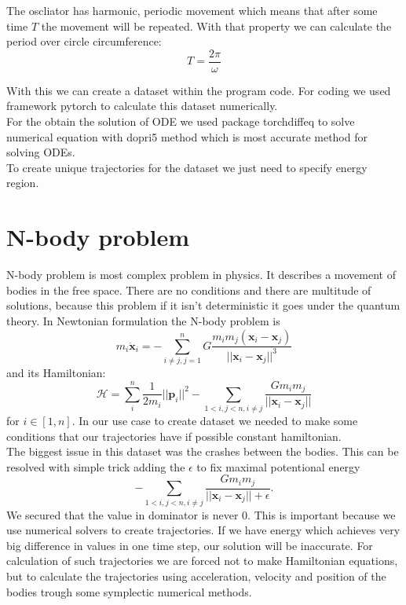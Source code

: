 The oscliator has harmonic, periodic movement which means that after some time $T$ the movement will be repeated. With that property we can calculate the period over circle circumference:
\begin{equation}
	T = \frac{2\pi}{\omega}
\end{equation}

With this we can create a dataset within the program code. For coding we used framework pytorch to calculate this dataset numerically.\\
For the obtain the solution of ODE we used package torchdiffeq to solve numerical equation with dopri5 method which is most accurate method for solving ODEs.\\
To create unique trajectories for the dataset we just need to specify energy region.


\section{N-body problem}
N-body problem is most complex problem in physics. It describes a movement of bodies in the free space. There are no conditions and there are multitude of solutions, because this problem if it isn't deterministic it goes under the quantum theory. 
In Newtonian formulation the N-body problem is
\begin{equation}
m_i\ddot{\mathbf{x}}_i = -\sum_{i\neq j, j=1}^nG\frac{m_im_j(\mathbf{x}_i-\mathbf{x}_j)}{||\mathbf{x}_i-\mathbf{x}_j||^3}
\end{equation} 
and its Hamiltonian:
\begin{equation}
	\mathcal{H} =\sum_i^n \frac{1}{2m_i}||\mathbf{p}_i||^2 - \sum_{1<i,j<n,i\neq j}\frac{Gm_im_j}{||\mathbf{x}_i-\mathbf{x}_j||}
\end{equation} 
for $i \in[1,n].$
In our use case to create  dataset we needed to make some conditions that our trajectories have if possible constant hamiltonian.\\
The biggest issue in this dataset was the crashes between the bodies.
This can be resolved with simple trick adding the $\epsilon$ to fix maximal potentional energy
\begin{equation}
	- \sum_{1<i,j<n,i\neq j}\frac{Gm_im_j}{||\mathbf{x}_i-\mathbf{x}_j||+\epsilon}.
\end{equation}
We secured that the value in dominator is never 0. This is important because we use numerical solvers to create trajectories. If we have energy which achieves very big difference in values in one time step, our solution will be inaccurate. For calculation of such trajectories we are forced not to make Hamiltonian equations, but to calculate the trajectories using acceleration, velocity and position of the bodies trough some symplectic numerical methods.
